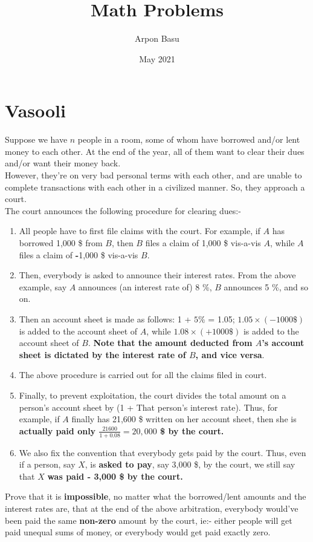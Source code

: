 \documentclass{article}
\title{Math Problems}
\author{Arpon Basu}
\date{May 2021}
\begin{document}
\maketitle

\section{Vasooli}
Suppose we have $n$ people in a room, some of whom have borrowed and/or lent money to each other. At the end of the year, all of them want to clear their dues and/or want their money back.\\
However, they're on very bad personal terms with each other, and are unable to complete transactions with each other in a civilized manner. So, they approach a court.\\
The court announces the following procedure for clearing dues:-\\
\begin{enumerate}
   \item All people have to first file claims with the court. For example, if $A$ has borrowed 1,000 \$  from $B$, then $B$ files a claim of 1,000 \$ vis-a-vis $A$, while $A$ files a claim of \textbf{-}1,000 \$ vis-a-vis $B$.
   
   \item Then, everybody is asked to announce their interest rates. From the above example, say $A$ announces (an interest rate of) 8 \%, $B$ announces 5 \%, and so on.
   
   \item Then an account sheet is made as follows:
        1 + $5\%$ = 1.05; $1.05\times(-1000 \$)$ is added to the account sheet of $A$, while $1.08\times(+1000 \$)$ is added to the account sheet of $B$. \textbf{Note that the amount deducted from $A$'s account sheet is dictated by the interest rate of $B$, and vice versa}.
    
    \item The above procedure is carried out for all the claims filed in court.
    
    \item Finally, to prevent exploitation, the court divides the total amount on a person's account sheet by (1 + That person's interest rate). Thus, for example, if $A$ finally has 21,600 \$ written on her account sheet, then she is \textbf{actually paid only $\frac{21600}{1 + 0.08} = 20,000$ \$ by the court.}
    
    \item We also fix the convention that everybody gets paid by the court. Thus, even if a person, say $X$, is \textbf{asked to pay}, say 3,000 \$, by the court, we still say that $X$ \textbf{was paid - 3,000 \$ by the court.}
\end{enumerate}
 Prove that it is \textbf{impossible}, no matter what the borrowed/lent amounts and the interest rates are, that at the end of the above arbitration, everybody would've been paid the same \textbf{non-zero} amount by the court, ie:- either people will get paid unequal sums of money, or everybody would get paid exactly zero.
\end{document}
